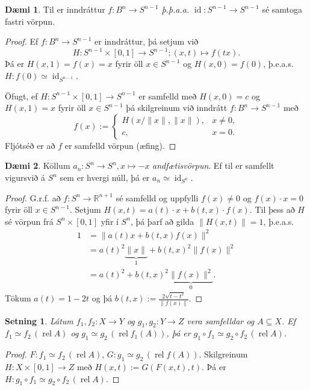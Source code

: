 \documentclass[a4paper,icelandic]{book}
\theoremstyle{definition}
\newtheorem{daemi}{Dæmi}[section]
\theoremstyle{plain}
\newtheorem{setn}{Setning}[section]
\theoremstyle{remark}
\newcommand{\R}{\mathbb{R}} %
\DeclareMathOperator{\id}{id} %
\DeclareMathOperator{\rel}{rel}
\newcommand{\prel}[1]{\,\left(\rel #1\right)}
\begin{document}
\begin{daemi}
  Til er inndráttur $f:B^n \to S^{n-1}$ \emph{þ.þ.a.a.}
  $\id:S^{n-1}\to S^{n-1}$ sé samtoga fastri vörpun.
\end{daemi}
\begin{proof}
  Ef $f:B^{n}\to S^{n-1}$ er inndráttur, þá setjum við\[
  H: S^{n-1}\times[0,1]\to S^{n-1}; (x,t)\mapsto f(tx).
  \]
  Þá er $H(x,1) = f(x) = x$ fyrir öll $x\in S^{n-1}$ og $H(x,0) = f(0)$,
  þ.e.a.s. $H:f(0)\simeq \id_{S^{n-1}}$.

  Öfugt, ef $H:S^{n-1}\times[0,1]\to S^{n-1}$ er samfelld með $H(x,0)=
  c$ og $H(x,1) = x$ fyrir öll $x\in S^{n-1}$ þá skilgreinum við
  inndrátt $f:B^n\to S^{n-1}$ með\[
  f(x) := 
  \begin{cases}
    H(x/\|x\|, \|x\|), & x \neq 0,\\
    c,                 & x = 0.
  \end{cases}
  \]
  Fljótséð er að $f$ er samfelld vörpun (æfing).
\end{proof}
\begin{daemi}
  Köllum $a_n : S^n\to S^n, x\mapsto -x$
  \emph{andfætisvörpun}. Ef til er samfellt
  vigursvið á $S^n$ sem er hvergi núll, þá er $a_n\simeq \id_{S^n}$.
\end{daemi}
\begin{proof}
  G.r.f. að $f:S^n \to \R^{n+1}$ sé samfelld og uppfylli $f(x)\neq 0$ og
  $f(x)\cdot x = 0$ fyrir öll $x\in S^{n-1}$. Setjum $H(x,t)=a(t)\cdot x
  + b(t,x)\cdot f(x)$. Til þess að $H$ sé vörpun frá $S^n\times[0,1]$ yfir
  í $S^n$, þá þarf að gilda $\|H(x,t)\|=1$, þ.e.a.s.
  \begin{align*}
    1
    &= \| a(t)x + b(t,x)f(x) \|^2 \\
    &= a(t)^2 \underbrace{\|x\|}_{1} + b(t,x)^2 \|f(x)\|^2  \\
    &= a(t)^2 + b(t,x)^2\underbrace{\|f(x)\|^2}_{0}.
  \end{align*}
  Tökum $a(t)=1-2t$ og þá $b(t,x) := \frac{2\sqrt{t-t^2}}{\|f(x)\|}$.
\end{proof}
\begin{setn}\label{setn:samtog_ohad}
  Látum $f_1,f_2:X\to Y$ og $g_1,g_2: Y\to Z$ vera samfelldar og
  $A\subseteq X$. Ef $f_1\simeq f_2\prel A$ og $g_1\simeq
  g_2\prel{f_1(A)}$, þá er $g_1\circ f_1\simeq g_2\circ f_2\prel A$.
\end{setn}
\begin{proof}
  $F:f_1\simeq f_2\prel A$, $G:g_1\simeq g_2\prel{f(A)}$. Skilgreinum
  $H:X\times[0,1]\to Z$ með $H(x,t) := G(F(x,t),t)$. Þá er $H:g_1\circ
  f_1\simeq g_2\circ f_2 \prel A$.
\end{proof}
\end{document}
